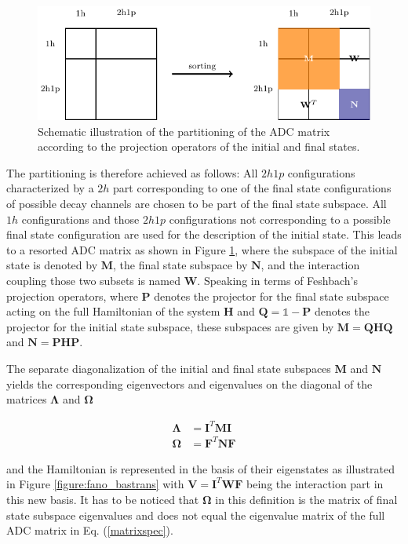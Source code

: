 \begin{figure}[h]
  \centering
  \includegraphics[scale=0.7]{pics/fano_matsort_pgf.pdf}
  \caption{Schematic illustration of the partitioning of the ADC matrix
           according to the projection operators of the initial and final
           states.}
  \label{figure:fano_matsort}
\end{figure}

The partitioning is therefore achieved as follows:
All $2h1p$ configurations characterized by a $2h$
part corresponding to one of the
final state configurations of possible decay channels
are chosen to be part of the final state subspace.
All $1h$ configurations and those $2h1p$ configurations not corresponding
to a possible final state configuration are used for the description
of the initial state. This leads to a resorted ADC matrix as shown in
Figure \ref{figure:fano_matsort}, where the subspace of the initial state
is denoted by $\mathbf{M}$, the final state subspace by $\mathbf{N}$, and
the interaction coupling those two subsets is named $\mathbf{W}$.
Speaking in terms of Feshbach's projection operators, where $\mathbf{P}$
denotes the projector for the final state subspace acting on the full
Hamiltonian of the system $\mathbf{H}$ and
$\mathbf{Q}=\mathds{1}- \mathbf{P}$
denotes the projector for the initial state subspace, these subspaces are
given by $\mathbf{M}=\mathbf{Q}\mathbf{H}\mathbf{Q}$ and
$\mathbf{N} = \mathbf{P}\mathbf{H}\mathbf{P}$.


The separate diagonalization of the initial and final state subspaces
$\mathbf{M}$ and $\mathbf{N}$ yields
the corresponding eigenvectors and eigenvalues on the diagonal of the
matrices $\mathbf{\Lambda}$ and $\mathbf{\Omega}$

\begin{align}
  \mathbf{\Lambda} &= \mathbf{I}^T \mathbf{M} \mathbf{I}  \\
  \mathbf{\Omega}  &= \mathbf{F}^T \mathbf{N} \mathbf{F} 
\end{align}

and the Hamiltonian is represented in the basis of their eigenstates
as illustrated in
Figure \ref{figure:fano_bastrans} with $\mathbf{V} = \mathbf{I}^T \mathbf{W} \mathbf{F}$
being the interaction part
in this new basis. It has to be noticed that $\mathbf{\Omega}$ in this
definition is the matrix of final state subspace eigenvalues and
does not equal the eigenvalue matrix of the full ADC matrix in Eq.
(\ref{matrixspec}).

